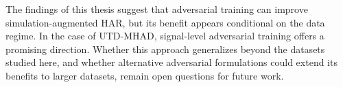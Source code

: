 The findings of this thesis suggest that adversarial training can improve simulation-augmented HAR, but its benefit appears conditional on the data regime. In the case of UTD-MHAD, signal-level adversarial training offers a promising direction. Whether this approach generalizes beyond the datasets studied here, and whether alternative adversarial formulations could extend its benefits to larger datasets, remain open questions for future work.
